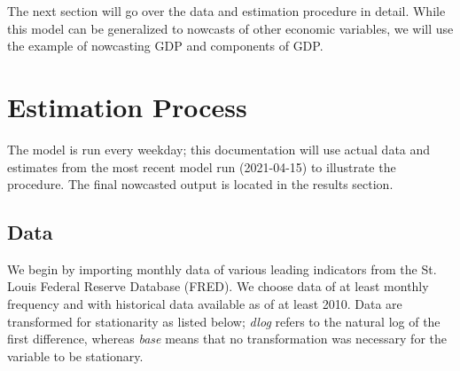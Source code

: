 \documentclass[11pt, letterpaper]{article}\usepackage[]{graphicx}\usepackage[]{color}
\begin{document}
The next section will go over the data and estimation procedure in detail. While this model can be generalized to nowcasts of other economic variables, we will use the example of nowcasting GDP and components of GDP.

\newpage
\section{Estimation Process}
The model is run every weekday; this documentation will use actual data and estimates from the most recent model run (2021-04-15) to illustrate the procedure. The final nowcasted output is located in the results section.

\subsection{Data}
We begin by importing monthly data of various leading indicators from the St. Louis Federal Reserve Database (FRED). We choose data of at least monthly frequency and with historical data available as of at least 2010. Data are transformed for stationarity as listed below; \textit{dlog} refers to the natural log of the first difference, whereas \textit{base} means that no transformation was necessary for the variable to be stationary.
\end{document}
